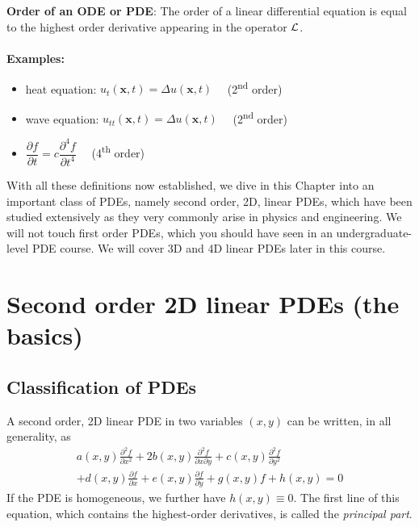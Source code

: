 \\
\\
{\bf Order of an ODE or PDE}: The order of a linear differential equation is equal to the highest order derivative appearing in the operator ${\cal L}$. \\
\\
{\bf Examples:}
\begin{itemize}
    \item 
    \color{red}
    heat equation: $u_{t}(\mathbf{x},t) = \Delta u(\mathbf{x},t) \quad$ 
    (2\textsuperscript{nd} order)
    \color{black}
    \item 
    \color{red}
    wave equation: $u_{tt}(\mathbf{x},t) = \Delta u(\mathbf{x},t) \quad$ 
    (2\textsuperscript{nd} order)
    \color{black}
    \item
    \color{red}
    $\dfrac{\partial f}{\partial t} = c \dfrac{\partial^{4} f}{\partial t^{4}} \quad$ 
    (4\textsuperscript{th} order)
    \color{black}
\end{itemize}

With all these definitions now established, we dive in this Chapter into an important class of PDEs, namely second order, 2D, linear PDEs, which have been studied extensively as they very commonly arise in physics and  engineering. We will not touch first order PDEs, which you should have seen in an undergraduate-level PDE course. We will cover 3D and 4D linear PDEs later in this course.

\section{Second order 2D linear PDEs (the basics)}

\subsection{Classification of PDEs}

A second order, 2D linear PDE in two variables $(x,y)$ can be written, in all generality, as 
\begin{eqnarray}
    a(x,y) \frac{\partial^2 f}{\partial x^2} + 2b(x,y) \frac{\partial^2 f}{\partial x \partial y} + c(x,y) \frac{\partial^2 f}{\partial y^2} \nonumber \\ + d(x,y) \frac{\partial f}{\partial x} + e(x,y) \frac{\partial f}{\partial y}  + g(x,y) f + h(x,y) = 0
    \label{eq:generalform}
\end{eqnarray}
If the PDE is homogeneous, we further have $h(x,y) \equiv 0$.  
The first line of this equation, which contains the highest-order derivatives, is called the {\it principal part}. 

